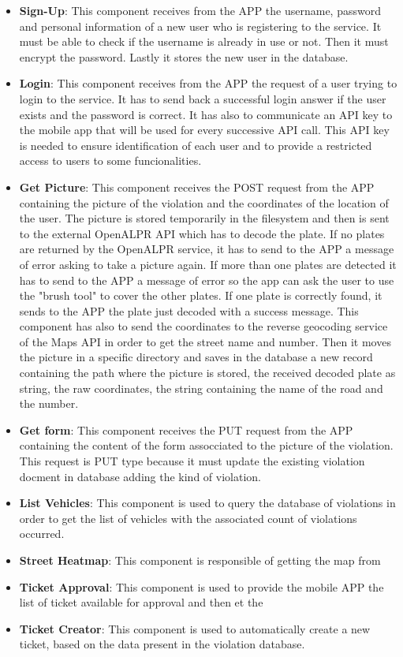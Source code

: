 \begin{itemize}
  \item \textbf{Sign-Up}: This component receives from the APP the username, password and personal information of a new user who is registering to the service. It must be able to check if the username is already in use or not. Then it must encrypt the password. Lastly it stores the new user in the database.
  \item \textbf{Login}: This component receives from the APP the request of a user trying to login to the service. It has to send back a successful login answer if the user exists and the password is correct. It has also to communicate an API key to the mobile app that will be used for every successive API call. This API key is needed to ensure identification of each user and to provide a restricted access to users to some funcionalities.
  \item \textbf{Get Picture}: This component receives the POST request from the APP containing the picture of the violation and the coordinates of the location of the user. The picture is stored temporarily in the filesystem and then is sent to the external OpenALPR API which has to decode the plate. If no plates are returned by the OpenALPR service, it has to send to the APP a message of error asking to take a picture again. If more than one plates are detected it has to send to the APP a message of error so the app can ask the user to use the "brush tool" to cover the other plates. If one plate is correctly found, it sends to the APP the plate just decoded with a success message. This component has also to send the coordinates to the reverse geocoding service of the Maps API in order to get the street name and number. Then it moves the picture in a specific directory and saves in the database a new record containing the path where the picture is stored, the received decoded plate as string, the raw coordinates, the string containing the name of the road and the number.
  \item \textbf{Get form}: This component receives the PUT request from the APP containing the content of the form assocciated to the picture of the violation. This request is PUT type because it must update the existing violation docment in database adding the kind of violation.
  \item \textbf{List Vehicles}: This component is used to query the database of violations in order to get the list of vehicles with the associated count of violations occurred.
  \item \textbf{Street Heatmap}: This component is responsible of getting the map from
  \item \textbf{Ticket Approval}: This component is used to provide the mobile APP the list of ticket available for approval and then et the
  \item \textbf{Ticket Creator}: This component is used to automatically create a new ticket, based on the data present in the violation database.



\end{itemize}
